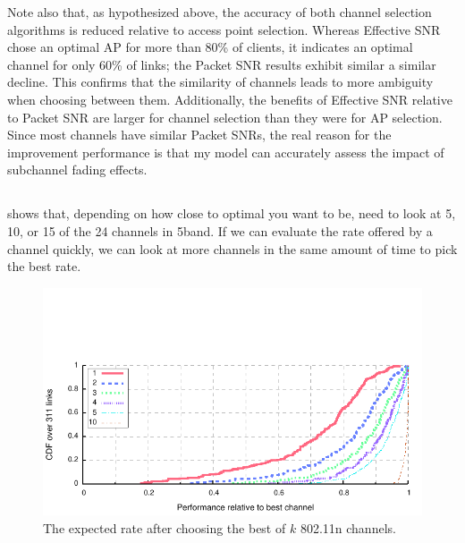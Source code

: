 Note also that, as hypothesized above, the accuracy of both channel selection algorithms is reduced relative to access point selection. Whereas Effective SNR chose an optimal AP for more than 80\% of clients, it indicates an optimal channel for only 60\% of links; the Packet SNR results exhibit similar a similar decline. This confirms that the similarity of channels leads to more ambiguity when choosing between them. Additionally, the benefits of Effective SNR relative to Packet SNR are larger for channel selection than they were for AP selection. Since most channels have similar Packet SNRs, the real reason for the improvement performance is that my model can accurately assess the impact of subchannel fading effects.

\subsection{}
  shows that, depending on how close to optimal you want to be, need to look at 5, 10, or 15 of the 24 channels in 5\GHz band. If we can evaluate the rate offered by a channel quickly, we can look at more channels in the same amount of time to pick the best rate.

\begin{figure}[htp]
	\centering
	\includegraphics[width=\textwidth]{figures/applications/chan_sel_rel_diff_draws.pdf}
	\caption[The expected rate after choosing the best of $k$ 802.11n channels]{\label{fig:rel_diff_draws}The expected rate after choosing the best of $k$ 802.11n channels.}
\end{figure}

 

 